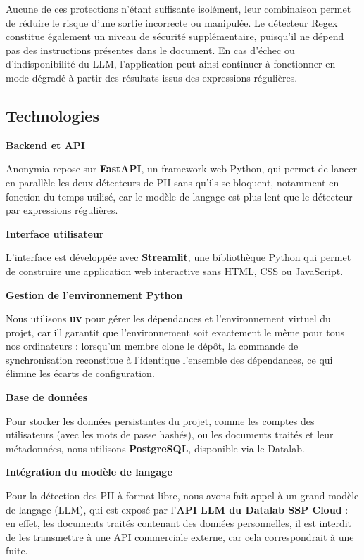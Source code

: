 \documentclass[12pt,a4paper]{article}
\begin{document}
Aucune de ces protections n'étant suffisante isolément, leur combinaison permet de réduire le risque d'une sortie incorrecte ou manipulée. Le détecteur Regex constitue également un niveau de sécurité supplémentaire, puisqu'il ne dépend pas des instructions présentes dans le document. En cas d'échec ou
d'indisponibilité du LLM, l'application peut ainsi continuer à fonctionner en mode dégradé à partir des résultats issus des expressions régulières.

\subsection{Technologies}

\textbf{Backend et API}


Anonymia repose sur \textbf{FastAPI}, un framework web Python, qui permet de lancer en parallèle les deux détecteurs de PII sans qu’ils se bloquent, notamment en fonction du temps utilisé, car le modèle de langage est plus lent que le détecteur par expressions régulières.
\newline

\textbf{Interface utilisateur}


L'interface est développée avec \textbf{Streamlit}, une bibliothèque Python qui permet de construire une application web interactive sans HTML, CSS ou JavaScript.
\newline

\textbf{Gestion de l'environnement Python}


Nous utilisons \textbf{uv} pour gérer les dépendances et l'environnement virtuel du projet, car ill garantit que l'environnement soit exactement le même pour tous nos ordinateurs : lorsqu'un membre clone le dépôt, la commande de synchronisation reconstitue à l'identique l'ensemble des dépendances, ce qui élimine les écarts de configuration.
\newline

\textbf{Base de données}


Pour stocker les données persistantes du projet, comme les comptes des utilisateurs (avec les mots de passe hashés), ou les documents traités et leur métadonnées, nous utilisons \textbf{PostgreSQL}, disponible via le Datalab.
\newline

\textbf{Intégration du modèle de langage}


Pour la détection des PII à format libre, nous avons fait appel à un grand modèle de langage (LLM), qui est exposé par l'\textbf{API LLM du Datalab SSP Cloud} :  en effet, les documents traités contenant des données personnelles, il est interdit de les transmettre à une API commerciale externe, car cela correspondrait à une fuite.
\end{document}
